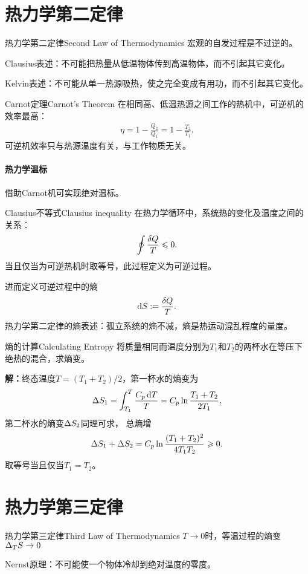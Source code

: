 \section{热力学第二定律}
\begin{theorem}{热力学第二定律}{Second Law of Thermodynamics}
	宏观的自发过程是不过逆的。
	\begin{compactitem}
		\item Clausius表述：不可能把热量从低温物体传到高温物体，而不引起其它变化。
		\item Kelvin表述：不可能从单一热源吸热，使之完全变成有用功，而不引起其它变化。
	\end{compactitem}
\end{theorem}
\begin{theorem}{Carnot定理}{Carnot's Theorem}
	在相同高、低温热源之间工作的热机中，可逆机的效率最高：
	\begin{align}
		\eta=1-\frac{Q_2}{Q_1}=1-\frac{T_2}{T_1}.
	\end{align}
	可逆机效率只与热源温度有关，与工作物质无关。
\end{theorem}
\paragraph{热力学温标}借助Carnot机可实现绝对温标。
\begin{theorem}{Clausius不等式}{Clausius inequality}
	在热力学循环中，系统热的变化及温度之间的关系：
	\begin{equation}
		\oint\frac{\mathop{}\!\delta Q}T\leqslant 0.
	\end{equation}
	当且仅当为可逆热机时取等号，此过程定义为可逆过程。
\end{theorem}
进而定义可逆过程中的熵
\begin{align}
	\mathop{}\!\mathrm{d} S:=\frac{\mathop{}\!\delta Q}T.
\end{align}
热力学第二定律的熵表述：孤立系统的熵不减，熵是热运动混乱程度的量度。
\begin{example}{熵的计算}{Calculating Entropy}
	将质量相同而温度分别为$T_1$和$T_2$的两杯水在等压下绝热的混合，求熵变。

	\textbf{解：}终态温度$T=(T_1+T_2)/2$，第一杯水的熵变为
	\[
		\Delta S_1=\int_{T_1}^T\frac{C_p\mathop{}\!\mathrm{d} T}T=C_p\ln\frac{T_1+T_2}{2T_1},
	\]
	第二杯水的熵变$\Delta S_2$同理可求，
	总熵增
	\[
		\Delta S_1+\Delta S_2=C_p\ln\frac{(T_1+T_2)^2}{4T_1T_2}\geqslant 0.
	\]
	取等号当且仅当$T_1=T_2$。
\end{example}
\section{热力学第三定律}
\begin{theorem}{热力学第三定律}{Third Law of Thermodynamics}
	$T\to 0$时，等温过程的熵变$\Delta_TS\to 0$

	Nernst原理：不可能使一个物体冷却到绝对温度的零度。
\end{theorem}